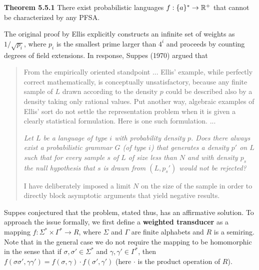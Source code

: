 \smallskip
\noindent
{\bf Theorem 5.5.1} \cite{Ellis:1969} There exist probabilistic languages $f:
\{a\}^* \rightarrow {\Bbb R}^+$ that cannot be characterized by any PFSA.

\smallskip\noindent The original proof by Ellis explicitly constructs an
infinite set of weights as $1/\sqrt{p_i}$, where $p_i$ is the smallest prime
larger than $4^i$ and proceeds by counting degrees of field extensions. In
response, Suppes (1970) \nocite{Suppes:1970} argued that

\begin{quote}
From the empirically oriented standpoint ... Ellis' example, while perfectly
correct mathematically, is conceptually unsatisfactory, because any finite 
sample of $L$ drawn according to the density $p$ could be described also by 
a density taking only rational values. Put another way, algebraic examples of 
Ellis' sort do not settle the representation problem when it is given a
clearly statistical formulation. Here is one such formulation. ...

\smallskip
{\it Let $L$ be a language of type $i$ with probability density $p$. Does
  there always exist a probabilistic grammar $G$ (of type $i$) that generates
  a density $p'$ on $L$ such that for every sample $s$ of $L$ of size less
  than $N$ and with density $p_s$ the null hypothesis that $s$ is drawn from
  $(L,p_s')$ would not be rejected?}

\smallskip
I have deliberately imposed a limit $N$ on the size of the sample in order 
to directly block asymptotic arguments that yield negative results.
\end{quote}

Suppes conjectured that the problem, stated thus, has an affirmative solution.
To approach the issue formally, we first define a {\bf weighted transducer} as
a mapping $f: \Sigma^* \times \Gamma^* \rightarrow R$, where $\Sigma$ and
$\Gamma$ are finite alphabets and $R$ is a semiring.
 Note that in the general case we do not require
the mapping to be homomorphic in the sense that if $\sigma, \sigma' \in
\Sigma^*$ and $\gamma, \gamma' \in \Gamma^*$, then
$f(\sigma\sigma',\gamma\gamma')= f(\sigma,\gamma) \cdot f(\sigma',\gamma')$
(here $\cdot$ is the product operation of $R$).

